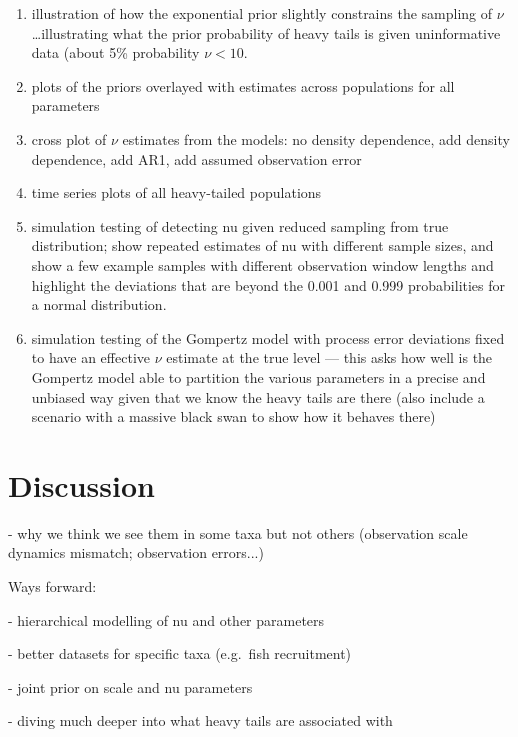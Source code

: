 \documentclass[10pt]{article}
\begin{document}
\begin{enumerate}


\item illustration of how the exponential prior slightly constrains the sampling of $\nu$\ldots illustrating what the prior probability of heavy tails is given uninformative data (about 5\% probability $\nu < 10$.

\item plots of the priors overlayed with estimates across populations for all parameters

\item cross plot of $\nu$ estimates from the models: no density dependence, add density dependence, add AR1, add assumed observation error

\item time series plots of all heavy-tailed populations

\item simulation testing of detecting nu given reduced sampling from true distribution; show repeated estimates of nu with different sample sizes, and show a few example samples with different observation window lengths and highlight the deviations that are beyond the 0.001 and 0.999 probabilities for a normal distribution.

\item simulation testing of the Gompertz model with process error deviations fixed to have an effective $\nu$ estimate at the true level --- this asks how well is the Gompertz model able to partition the various parameters in a precise and unbiased way given that we know the heavy tails are there (also include a scenario with a massive black swan to show how it behaves there)

\end{enumerate}

\section*{Discussion}

- why we think we see them in some taxa but not others (observation scale dynamics mismatch; observation errors...)

Ways forward:

- hierarchical modelling of nu and other parameters

- better datasets for specific taxa (e.g.\ fish recruitment)

- joint prior on scale and nu parameters

- diving much deeper into what heavy tails are associated with
\end{document}
